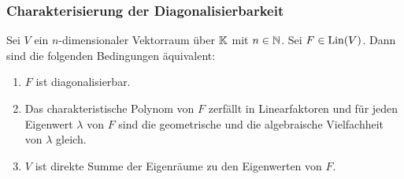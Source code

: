 \subsubsection{Charakterisierung der Diagonalisierbarkeit}

\begin{thm}
	Sei $ V $ ein $ n $-dimensionaler Vektorraum über $ \mathbb K $ mit $ n \in \mathbb N $. Sei $ F \in \operatorname{Lin}(V) $. Dann sind die folgenden Bedingungen äquivalent:
	\begin{enumerate}
		\item
			$ F $ ist diagonalisierbar.
		\item
			Das charakteristische Polynom von $ F $ zerfällt in Linearfaktoren und für jeden Eigenwert $ \lambda $ von $ F $ sind die geometrische und die algebraische Vielfachheit von $ \lambda $ gleich.
		\item
			$ V $ ist direkte Summe der Eigenräume zu den Eigenwerten von $ F $.
	\end{enumerate}
\end{thm}
